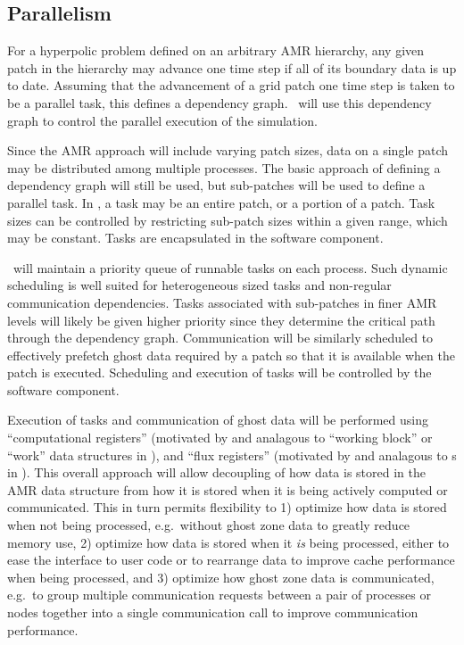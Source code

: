 \documentclass[10pt,twocolumn]{article}
\begin{document}
\subsection{Parallelism} \label{ss:design-parallel}

For a hyperpolic problem defined on an arbitrary AMR hierarchy, any
given patch in the hierarchy may advance one time step if all of its
boundary data is up to date.  Assuming that the advancement of a grid
patch one time step is taken to be a parallel task, this defines a
dependency graph.  \cello\ will use this dependency graph to control
the parallel execution of the simulation.

Since the AMR approach will include varying patch sizes, data on a
single patch may be distributed among multiple processes.  The basic
approach of defining a dependency graph will still be used, but
sub-patches will be used to define a parallel task.  In \cello, a task
may be an entire patch, or a portion of a patch.  Task sizes can be
controlled by restricting sub-patch sizes within a given range, which
may be constant.  Tasks are encapsulated in the  software
component.

\cello\ will maintain a priority queue of runnable tasks on each
process.  Such dynamic scheduling is well suited for heterogeneous
sized tasks and non-regular communication dependencies. Tasks
associated with sub-patches in finer AMR levels will likely be given
higher priority since they determine the critical path through the
dependency graph.  Communication will be similarly scheduled to
effectively prefetch ghost data required by a patch so that it is
available when the patch is executed.  Scheduling and execution of
tasks will be controlled by the  software component.

Execution of tasks and communication of ghost data will be performed
using ``computational registers'' (motivated by and analagous to
``working block'' or ``work'' data structures in \paramesh), and
``flux registers'' (motivated by and analagous to
s in \chombo).  This overall approach will
allow decoupling of how data is stored in the AMR data structure from
how it is stored when it is being actively computed or communicated.
This in turn permits flexibility to 1) optimize how data is stored
when not being processed, e.g.~without ghost zone data to greatly
reduce memory use, 2) optimize how data is stored when it \textit{is}
being processed, either to ease the interface to user code or to
rearrange data to improve cache performance when being processed, and
3) optimize how ghost zone data is communicated, e.g.~to group
multiple communication requests between a pair of processes or nodes
together into a single communication call to improve communication
performance.
\end{document}
